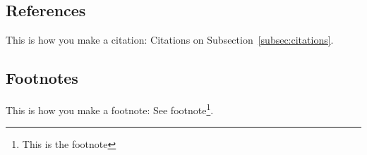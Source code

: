 \documentclass[a4paper]{article}
\begin{document}
\subsection{References}\label{subsec:references}

This is how you make a citation: Citations on Subsection~\ref{subsec:citations}.

\subsection{Footnotes}\label{subsec:footnotes}

This is how you make a footnote: See footnote\footnote{This is the footnote}.



\end{document}
